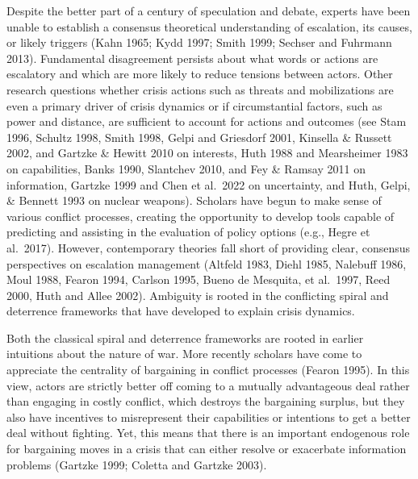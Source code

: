 \documentclass[
  letterpaper,
  DIV=11,
  numbers=noendperiod]{scrartcl}
\begin{document}
Despite the better part of a century of speculation and debate, experts
have been unable to establish a consensus theoretical understanding of
escalation, its causes, or likely triggers (Kahn 1965; Kydd 1997; Smith
1999; Sechser and Fuhrmann 2013). Fundamental disagreement persists
about what words or actions are escalatory and which are more likely to
reduce tensions between actors. Other research questions whether crisis
actions such as threats and mobilizations are even a primary driver of
crisis dynamics or if circumstantial factors, such as power and
distance, are sufficient to account for actions and outcomes (see Stam
1996, Schultz 1998, Smith 1998, Gelpi and Griesdorf 2001, Kinsella \&
Russett 2002, and Gartzke \& Hewitt 2010 on interests, Huth 1988 and
Mearsheimer 1983 on capabilities, Banks 1990, Slantchev 2010, and Fey \&
Ramsay 2011 on information, Gartzke 1999 and Chen et al.~2022 on
uncertainty, and Huth, Gelpi, \& Bennett 1993 on nuclear weapons).
Scholars have begun to make sense of various conflict processes,
creating the opportunity to develop tools capable of predicting and
assisting in the evaluation of policy options (e.g., Hegre et al.~2017).
However, contemporary theories fall short of providing clear, consensus
perspectives on escalation management (Altfeld 1983, Diehl 1985,
Nalebuff 1986, Moul 1988, Fearon 1994, Carlson 1995, Bueno de Mesquita,
et al.~1997, Reed 2000, Huth and Allee 2002). Ambiguity is rooted in the
conflicting spiral and deterrence frameworks that have developed to
explain crisis dynamics.

Both the classical spiral and deterrence frameworks are rooted in
earlier intuitions about the nature of war. More recently scholars have
come to appreciate the centrality of bargaining in conflict processes
(Fearon 1995). In this view, actors are strictly better off coming to a
mutually advantageous deal rather than engaging in costly conflict,
which destroys the bargaining surplus, but they also have incentives to
misrepresent their capabilities or intentions to get a better deal
without fighting. Yet, this means that there is an important endogenous
role for bargaining moves in a crisis that can either resolve or
exacerbate information problems (Gartzke 1999; Coletta and Gartzke
2003).
\end{document}
